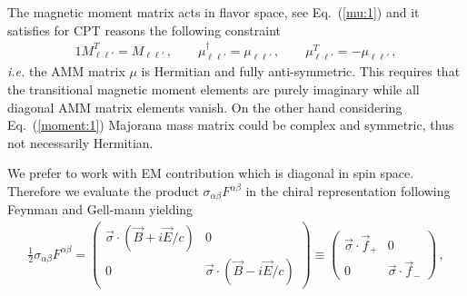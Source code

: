 \documentclass[addchapnum]{ws-rv961x669} %
\newcommand{\req}[1]{Eq.~(\ref{#1})}
\begin{document}
The magnetic moment matrix acts in flavor space, see \req{mu:1} and it satisfies for CPT reasons  the following constraint~\cite{Giunti:2014ixa}
\begin{alignat}{1}
	\label{props:1}	M_{\ell\ell'}^{T}=M_{\ell\ell'}\,,\qquad
    \mu_{\ell\ell'}^{\dag}=\mu_{\ell\ell'}\,,\qquad
    \mu_{\ell\ell'}^{T}=-\mu_{\ell\ell'}\,,
\end{alignat}
{\it i.e.\/} the AMM matrix $\mu$ is Hermitian and fully anti-symmetric. This requires that the transitional magnetic moment elements are purely imaginary while all diagonal AMM matrix elements vanish. On the other hand considering \req{moment:1} Majorana mass matrix could be complex and symmetric, thus not necessarily Hermitian.  

We prefer to work with EM contribution which is diagonal in spin space. Therefore we evaluate the product $\sigma_{\alpha\beta}F^{\alpha\beta}$ in the chiral representation following Feynman and Gell-mann\cite{Feynman:1958ty} yielding
\begin{align}
    \label{chiral:1}
    \frac{1}{2}\sigma_{\alpha\beta}F^{\alpha\beta}=
    \begin{pmatrix}
        \vec{\sigma}\cdot(\vec{B}+i\vec{E}/c) & 0\\
        0 & \vec{\sigma}\cdot(\vec{B}-i\vec{E}/c)
    \end{pmatrix}\equiv
    \begin{pmatrix}
        \vec{\sigma}\cdot\vec{f}_{+} & 0 \\
        0 & \vec{\sigma}\cdot\vec{f}_{-}
    \end{pmatrix}\,,
\end{align}
\end{document}

